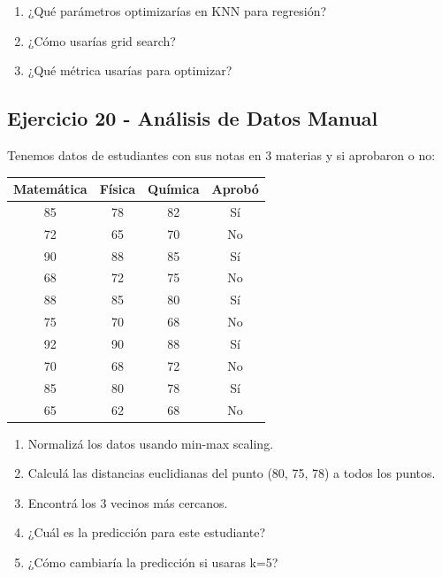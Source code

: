 \documentclass[12pt]{article}
\begin{document}
\begin{enumerate}
    \item ¿Qué parámetros optimizarías en KNN para regresión?
    \item ¿Cómo usarías grid search?
    \item ¿Qué métrica usarías para optimizar?
\end{enumerate}

\subsection{Ejercicio 20 - Análisis de Datos Manual}

Tenemos datos de estudiantes con sus notas en 3 materias y si aprobaron o no:

\begin{table}[H]
    \centering
    \begin{tabular}{cccc}
        \toprule
        \textbf{Matemática} & \textbf{Física} & \textbf{Química} & \textbf{Aprobó} \\
        \midrule
        85 & 78 & 82 & Sí \\
        72 & 65 & 70 & No \\
        90 & 88 & 85 & Sí \\
        68 & 72 & 75 & No \\
        88 & 85 & 80 & Sí \\
        75 & 70 & 68 & No \\
        92 & 90 & 88 & Sí \\
        70 & 68 & 72 & No \\
        85 & 80 & 78 & Sí \\
        65 & 62 & 68 & No \\
        \bottomrule
    \end{tabular}
\end{table}

\begin{enumerate}
    \item Normalizá los datos usando min-max scaling.
    \item Calculá las distancias euclidianas del punto (80, 75, 78) a todos los puntos.
    \item Encontrá los 3 vecinos más cercanos.
    \item ¿Cuál es la predicción para este estudiante?
    \item ¿Cómo cambiaría la predicción si usaras k=5?
\end{enumerate}
\end{document}
